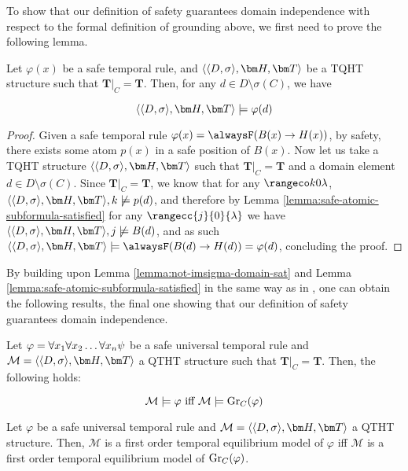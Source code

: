 To show that our definition of safety guarantees domain independence
with respect to the formal definition of grounding above, we first
need to prove the following lemma.

\begin{lemma}\label{lemma:not-imsigma-domain-sat}
  Let $\varphi(x)$ be a safe temporal rule, and $\qthandt$ be a
  TQHT structure such that $\bm{T}\vert_{C}=\bm{T}$. Then, for any
  $d \in D \setminus \sigma(C)$, we have

  \begin{equation*}
    \qthandt \models \varphi(d)
  \end{equation*}
  
\end{lemma}

\begin{proof}
  Given a safe temporal rule
  $\varphi(x) = \alwaysF(B(x) \rightarrow H(x))$, by safety, there
  exists some atom $p(x)$ in a safe position of $B(x)$. Now let us
  take a TQHT structure $\qthandt$ such that $\bm{T}\vert_{C}=\bm{T}$
  and a domain element $d \in D \setminus \sigma(C)$. Since
  $\bm{T}\vert_{C}=\bm{T}$, we know that for any $\kinlambda$,
  $\qthandt, k \not \models p(d)$, and therefore by Lemma
  \ref{lemma:safe-atomic-subformula-satisfied} for any
  $\rangecc{j}{0}{\lambda}$ we have $\qthandt,j \not \models B(d)$,
  and as such
  $\qthandt \models \alwaysF(B(d) \rightarrow H(d)) = \varphi(d)$,
  concluding the proof.
\end{proof}

By building upon Lemma \ref{lemma:not-imsigma-domain-sat} and Lemma
\ref{lemma:safe-atomic-subformula-satisfied} in the same way as in
\cite{agcapevidi17a}, one can obtain the following results, the final
one showing that our definition of safety guarantees domain independence.

\begin{proposition}\label{prop:sat-iff-sat-groundc}
  Let $\varphi = \forall x_1 \forall x_2 \dots \forall x_n \psi$ be a safe universal temporal rule and \\
  $\mathcal{M} = \qthandt$ a QTHT structure such that
  $\bm{T}\vert_{C}=\bm{T}$. Then, the following holds:

  \begin{equation*}
    \mathcal{M} \models \varphi \text{ iff } \mathcal{M} \models \operatorname{Gr}_{C}(\varphi)
  \end{equation*}
\end{proposition}

\begin{proposition}
  Let $\varphi$ be a safe universal temporal rule and
  $\mathcal{M} = \qthandt$ a QTHT structure. Then, $\mathcal{M}$ is a
  first order temporal equilibrium model of $\varphi$ iff
  $\mathcal{M}$ is a first order temporal equilibrium model of
  $\operatorname{Gr}_{C}(\varphi)$.
\end{proposition}


